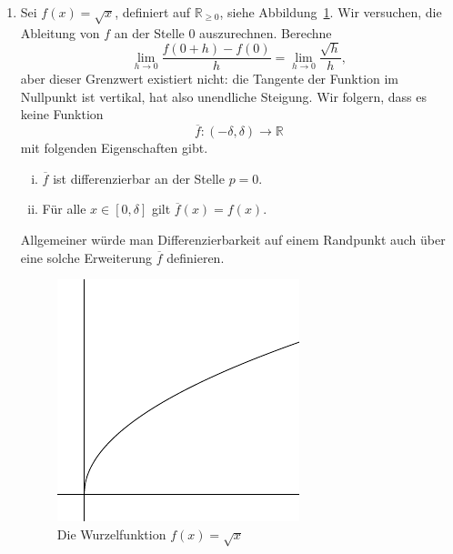 \documentclass[../main.tex]{subfiles}
\begin{document}
\begin{examples}
  \leavevmode
  \begin{enumerate}[(1)]
    \item Sei $f(x) = \sqrt x$,
      definiert auf $\mathbb{R}_{\geq 0}$,
      siehe Abbildung~\ref{fig:sqrt}.
      Wir versuchen, die Ableitung
      von $f$ an der Stelle $0$ auszurechnen.
      Berechne
      \[
        \lim_{h \to 0} \frac{f(0 + h) - f(0)}{h}
        = \lim_{h \to 0} \frac{\sqrt h}{h},
      \]
      aber dieser Grenzwert existiert nicht: 
      die Tangente der Funktion im Nullpunkt
      ist vertikal, hat also unendliche Steigung.
      Wir folgern, dass es keine Funktion
      \[
      \overline f \colon (- \delta, \delta) \to \mathbb{R}
      \]
      mit folgenden Eigenschaften gibt.
      \begin{enumerate}[(i)]
        \item $\overline f$ ist differenzierbar
          an der Stelle $p = 0$.
        \item Für alle $x \in [0, \delta]$ gilt
          $\overline f (x) = f(x)$.
      \end{enumerate}
      Allgemeiner würde man Differenzierbarkeit auf
      einem Randpunkt auch über eine solche
      Erweiterung $\overline f$ definieren.
      
      \begin{figure}[htb]
        \centering
        \includegraphics{images/sqrt}
        \caption{Die Wurzelfunktion $f(x) = \sqrt x$}%
        \label{fig:sqrt}
      \end{figure}


\end{enumerate}
\end{examples}
\end{document}
